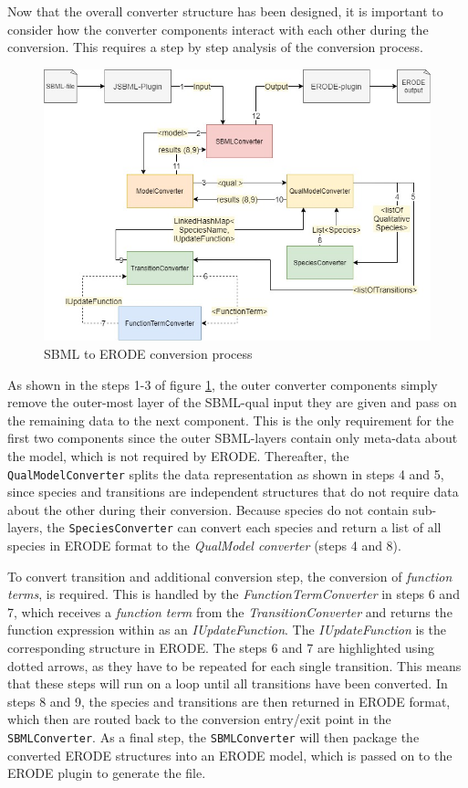 Now that the overall converter structure has been designed, it is important to consider how the converter components interact with each other during the conversion. This requires a step by step analysis of the conversion process.
\begin{figure}[H]
    \centering
    \includegraphics[scale=0.45]{Sections/Images/SBMLConversion.jpg}
    \caption{SBML to ERODE conversion process}
    \label{fig:SBMLConversion}
\end{figure}
As shown in the steps 1-3 of figure \ref{fig:SBMLConversion}, the outer converter components simply remove the outer-most layer of the SBML-qual input they are given and pass on the remaining data to the next component. This is the only requirement for the first two components since the outer SBML-layers contain only meta-data about the model, which is not required by ERODE. Thereafter, the \texttt{QualModelConverter} splits the data representation as shown in steps 4 and 5, since species and transitions are independent structures that do not require data about the other during their conversion. Because species do not contain sub-layers, the \texttt{SpeciesConverter} can convert each species and return a list of all species in ERODE format to the \emph{QualModel converter} (steps 4 and 8).

To convert transition and additional conversion step, the conversion of \emph{function terms}, is required. This is handled by the \emph{FunctionTermConverter} in steps 6 and 7, which receives a \emph{function term} from the \emph{TransitionConverter} and returns the function expression within as an \emph{IUpdateFunction}. The \emph{IUpdateFunction} is the corresponding structure in ERODE. The steps 6 and 7 are highlighted using dotted arrows, as they have to be repeated for each single transition. This means that these steps will run on a loop until all transitions have been converted.
In steps 8 and 9, the species and transitions are then returned in ERODE format, which then are routed back to the conversion entry/exit point in the \texttt{SBMLConverter}. As a final step, the \texttt{SBMLConverter} will then package the converted ERODE structures into an ERODE model, which is passed on to the ERODE plugin to generate the file.

